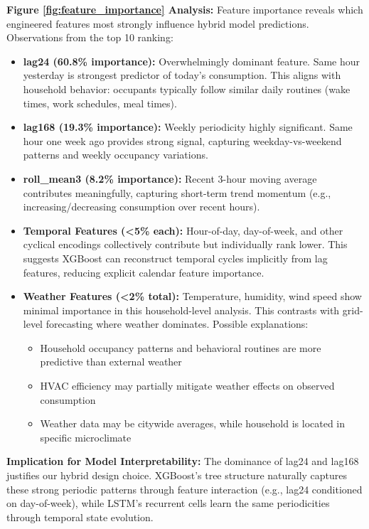 \documentclass[11pt, a4paper, oneside]{article}
\begin{document}
\textbf{Figure \ref{fig:feature_importance} Analysis:} Feature importance reveals which engineered features most strongly influence hybrid model predictions. Observations from the top 10 ranking:

\begin{itemize}
    \item \textbf{lag24 (60.8\% importance):} Overwhelmingly dominant feature. Same hour yesterday is strongest predictor of today's consumption. This aligns with household behavior: occupants typically follow similar daily routines (wake times, work schedules, meal times).
    
    \item \textbf{lag168 (19.3\% importance):} Weekly periodicity highly significant. Same hour one week ago provides strong signal, capturing weekday-vs-weekend patterns and weekly occupancy variations.
    
    \item \textbf{roll\_mean3 (8.2\% importance):} Recent 3-hour moving average contributes meaningfully, capturing short-term trend momentum (e.g., increasing/decreasing consumption over recent hours).
    
    \item \textbf{Temporal Features (<5\% each):} Hour-of-day, day-of-week, and other cyclical encodings collectively contribute but individually rank lower. This suggests XGBoost can reconstruct temporal cycles implicitly from lag features, reducing explicit calendar feature importance.
    
    \item \textbf{Weather Features (<2\% total):} Temperature, humidity, wind speed show minimal importance in this household-level analysis. This contrasts with grid-level forecasting where weather dominates. Possible explanations:
    \begin{itemize}
        \item Household occupancy patterns and behavioral routines are more predictive than external weather
        \item HVAC efficiency may partially mitigate weather effects on observed consumption
        \item Weather data may be citywide averages, while household is located in specific microclimate
    \end{itemize}
\end{itemize}

\textbf{Implication for Model Interpretability:} The dominance of lag24 and lag168 justifies our hybrid design choice. XGBoost's tree structure naturally captures these strong periodic patterns through feature interaction (e.g., lag24 conditioned on day-of-week), while LSTM's recurrent cells learn the same periodicities through temporal state evolution.
\end{document}
